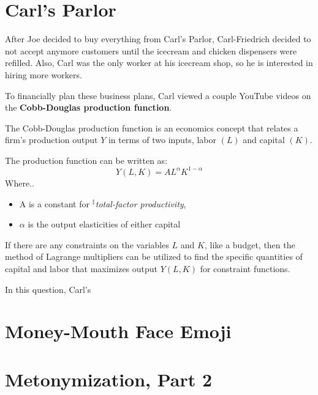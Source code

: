 \setcounter{chapter}{7}
\chapter{Carl's Parlor}
After Joe decided to buy everything from Carl's Parlor, Carl-Friedrich decided to not accept anymore customers until the icecream and chicken dispensers were refilled.
Also, Carl was the only worker at his icecream shop, so he is interested in hiring more workers.

To financially plan these business plans, Carl viewed a couple YouTube videos on the \textbf{Cobb-Douglas production function}.
\begin{remark}
	The Cobb-Douglas production function is an economics concept that relates a firm's production output $Y$ in terms of two inputs, labor $(L)$ and capital $(K)$.

	The production function can be written as:
	\[Y(L, K) = AL^{\alpha}K^{1 - \alpha}\]
	Where..
	\begin{itemize}
		\item A is a constant for \textit{$^\ddag$total-factor productivity},
		\item $\alpha$ is the output elasticities of either capital
	\end{itemize}
\end{remark}
If there are any constraints on the variables $L$ and $K$, like a budget, then the method of Lagrange multipliers can be utilized to find the specific quantities of capital and labor that maximizes output $Y(L, K)$ for constraint functions.

In this question, Carl's 
\[\]
\setcounter{chapter}{8}
\chapter{Money-Mouth Face Emoji}

\setcounter{chapter}{9}
\chapter{Metonymization, Part 2}